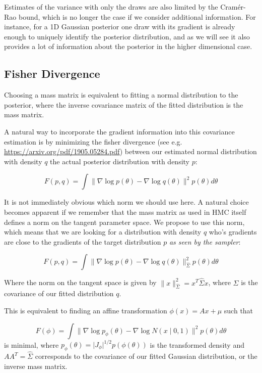 \documentclass{scrartcl}
\begin{document}
Estimates of the variance with only the draws are also limited by the
Cramér-Rao bound, which is no longer the case if we consider additional
information. For instance, for a 1D Gaussian posterior one draw with its
gradient is already enough to uniquely identify the posterior distribution, and
as we will see it also provides a lot of information about the posterior in the
higher dimensional case.

\subsection{Fisher Divergence}

Choosing a mass matrix is equivalent to fitting a normal distribution to the
posterior, where the inverse covariance matrix of the fitted distribution is
the mass matrix.

A natural way to incorporate the gradient information into this covariance
estimation is by minimizing the fisher divergence (see e.g.
\url{https://arxiv.org/pdf/1905.05284.pdf}) between our estimated normal
distribution with density $q$ the actual posterior distribution with density
$p$:

\[
  F(p, q)
    = \int \lVert \nabla \log p(\theta)
      - \nabla \log q(\theta)\rVert^2 p(\theta)d\theta
\]

It is not immediately obvious which norm we should use here. A natural choice
becomes apparent if we remember that the mass matrix as used in HMC itself
defines a norm on the tangent parameter space. We propose to use this norm,
which means that we are looking for a distribution with density $q$ who's
gradients are close to the gradients of the target distribution $p$ \emph{as
seen by the sampler}:

$$
  F(p, q)
    = \int \lVert \nabla \log p(\theta)
      - \nabla \log q(\theta)\rVert_{\hat\Sigma}^2 p(\theta)d\theta
$$

Where the norm on the tangent space is given by $\lVert x\lVert_{\hat\Sigma}^2
= x^T \hat\Sigma x$, where $\hat\Sigma$ is the covariance of our fitted
distribution $q$.

This is equivalent to finding an affine transformation $\phi(x) = Ax + \mu$
such that

\[
F(\phi)
  = \int \lVert \nabla \log p_\phi(\theta)
    - \nabla \log N(x \mid 0, 1) \rVert^2 p(\theta) d\theta
\]
is minimal, where $p_\phi(\theta) = \lvert J_\phi\rvert^{1/2} p(\phi(\theta))$
is the transformed density and $AA^T = \hat\Sigma$ corresponds to the
covariance of our fitted Gaussian distribution, or the inverse mass matrix.
\end{document}
